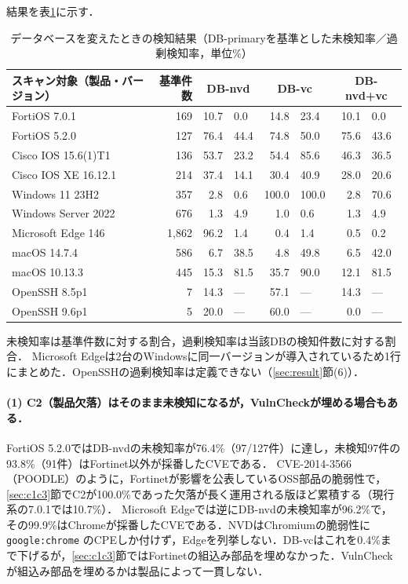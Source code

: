 結果を表\ref{tab:detect}に示す．

\begin{table}[htbp]
  \caption{データベースを変えたときの検知結果（DB-primaryを基準とした未検知率／過剰検知率，単位\%）}
  \label{tab:detect}
  \begin{center}
  \begin{tabular}{lr r@{\,/\,}l r@{\,/\,}l r@{\,/\,}l}
    \hline
    スキャン対象（製品・バージョン） & 基準件数 & \multicolumn{2}{c}{DB-nvd} & \multicolumn{2}{c}{DB-vc} & \multicolumn{2}{c}{DB-nvd+vc} \\
    \hline
    FortiOS 7.0.1 & 169 & 10.7 & 0.0 & 14.8 & 23.4 & 10.1 & 0.0 \\
    FortiOS 5.2.0 & 127 & 76.4 & 44.4 & 74.8 & 50.0 & 75.6 & 43.6 \\
    Cisco IOS 15.6(1)T1 & 136 & 53.7 & 23.2 & 54.4 & 85.6 & 46.3 & 36.5 \\
    Cisco IOS XE 16.12.1 & 214 & 37.4 & 14.1 & 30.4 & 40.9 & 28.0 & 20.6 \\
    Windows 11 23H2 & 357 & 2.8 & 0.6 & 100.0 & 100.0 & 2.8 & 70.6 \\
    Windows Server 2022 & 676 & 1.3 & 4.9 & 1.0 & 0.6 & 1.3 & 4.9 \\
    Microsoft Edge 146 & 1,862 & 96.2 & 1.4 & 0.4 & 1.4 & 0.5 & 0.2 \\
    macOS 14.7.4 & 586 & 6.7 & 38.5 & 4.8 & 49.8 & 6.5 & 42.0 \\
    macOS 10.13.3 & 445 & 15.3 & 81.5 & 35.7 & 90.0 & 12.1 & 81.5 \\
    OpenSSH 8.5p1 & 7 & 14.3 & --- & 57.1 & --- & 14.3 & --- \\
    OpenSSH 9.6p1 & 5 & 20.0 & --- & 60.0 & --- & 0.0 & --- \\
    \hline
  \end{tabular}
  \end{center}
  \footnotesize
  未検知率は基準件数に対する割合，過剰検知率は当該DBの検知件数に対する割合．
  Microsoft Edgeは2台のWindowsに同一バージョンが導入されているため1行にまとめた．OpenSSHの過剰検知率は定義できない（\ref{sec:result}節(6)）．
\end{table}

\paragraph{(1) C2（製品欠落）はそのまま未検知になるが，VulnCheckが埋める場合もある．}
FortiOS 5.2.0ではDB-nvdの未検知率が76.4\%（97/127件）に達し，未検知97件の93.8\%（91件）はFortinet以外が採番したCVEである．
CVE-2014-3566（POODLE）のように，Fortinetが影響を公表しているOSS部品の脆弱性で，\ref{sec:c1c3}節でC2が100.0\%であった欠落が長く運用される版ほど累積する（現行系の7.0.1では10.7\%）．
Microsoft Edgeでは逆にDB-nvdの未検知率が96.2\%で，その99.9\%はChromeが採番したCVEである．NVDはChromiumの脆弱性に \texttt{google:chrome} のCPEしか付けず，Edgeを列挙しない．DB-vcはこれを0.4\%まで下げるが，\ref{sec:c1c3}節ではFortinetの組込み部品を埋めなかった．VulnCheckが組込み部品を埋めるかは製品によって一貫しない．

